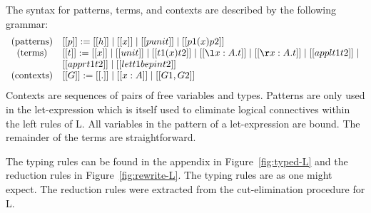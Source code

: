 \documentclass{llncs}
\begin{document}
The syntax for patterns, terms, and contexts are described by the
following grammar:
\[
\begin{array}{cll}
  \text{(patterns)} & [[p]] := [[h]] \mid [[x]] \mid [[punit]] \mid [[p1 (x) p2]]\\
  \text{(terms)}    & [[t]] := [[x]] \mid [[unit]] \mid [[t1 (x) t2]] \mid [[\l x : A.t]] \mid [[\r x : A.t]] \mid
  [[appl t1 t2]] \mid \\ & [[appr t1 t2]] \mid [[let t1 be p in t2]]\\
  \text{(contexts)} & [[G]] := [[.]] \mid [[x : A]] \mid [[G1,G2]]\\
\end{array}
\]
Contexts are sequences of pairs of free variables and types.  Patterns
are only used in the let-expression which is itself used to eliminate
logical connectives within the left rules of L.  All variables in the
pattern of a let-expression are bound.  The remainder of the terms are
straightforward.

The typing rules can be found in  the appendix in Figure~\ref{fig:typed-L} and the reduction rules in Figure~\ref{fig:rewrite-L}. The typing rules are as one might expect.  The reduction rules were extracted from the cut-elimination procedure for L.  



\iffalse
\begin{figure}[h]
  \begin{mdframed}
    \begin{mathpar}
      \LdruleTXXvar{} \and
      \LdruleTXXUr{} \and
      \LdruleTXXcut{} \and
      \LdruleTXXUl{} \and
      \LdruleTXXTl{} \and
      \LdruleTXXTr{} \and
      \LdruleTXXIRl{} \and
      \LdruleTXXILl{} \and
      \LdruleTXXIRr{} \and
      \LdruleTXXILr{} 
    \end{mathpar}
  \end{mdframed}
  \caption{Typing Rules for the Typed Lambek Calculus: $\lambda\text{L}$}
  \label{fig:typed-L}
\end{figure}
\begin{figure}[h]
  \begin{mdframed}
    \begin{mathpar}
      \LdruleRXXBetal{} \and
      \LdruleRXXBetar{} \and
      \LdruleRXXBetaU{} \and
      \LdruleRXXBetaTOne{} \and
      \LdruleRXXBetaTTwo{} \and
      \LdruleRXXNatU{} \and
      \LdruleRXXNatT{} \and
      \LdruleRXXLetU{} \and
    \end{mathpar}
  \end{mdframed}
  \caption{Rewriting Rules for the Lambek Calculus: $\lambda\text{L}$}
  \label{fig:rewrite-L}
\end{figure}
\fi 
\end{document}
